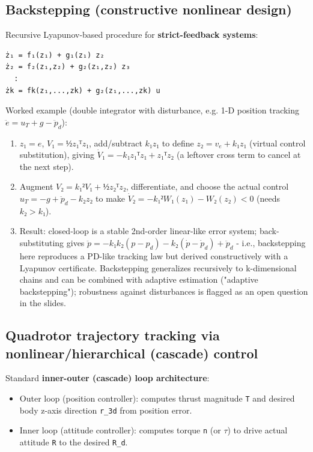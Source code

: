 \documentclass[11pt]{article}
\begin{document}
\subsection{Backstepping (constructive nonlinear design)}
Recursive Lyapunov-based procedure for \textbf{strict-feedback systems}:
\scriptsize
\begin{verbatim}
ż₁ = f₁(z₁) + g₁(z₁) z₂
ż₂ = f₂(z₁,z₂) + g₂(z₁,z₂) z₃
  :
żk = fk(z₁,...,zk) + g₂(z₁,...,zk) u
\end{verbatim}
\normalsize
Worked example (double integrator with disturbance, e.g. 1-D position tracking $\ddot{e} = u_T + g - \ddot{p}_d$):
\begin{enumerate}
\item $z₁=e$, $V₁=½z₁ᵀz₁$, add/subtract $k₁z₁$ to define $z₂ = v_e + k₁z₁$ (virtual control substitution), giving $\dot{V}₁ = -k₁z₁ᵀz₁ + z₁ᵀz₂$ (a leftover cross term to cancel at the next step).
\item Augment $V₂ = k₁²V₁ + ½z₂ᵀz₂$, differentiate, and choose the actual control $u_T = -g + \ddot{p}_d - k₂z₂$ to make $\dot{V}₂ = -k₁²W₁(z₁) - W₂(z₂) < 0$ (needs $k₂>k₁$).
\item Result: closed-loop is a stable 2nd-order linear-like error system; back-substituting gives $\ddot{p} = -k₁k₂(p-p_d) - k₂(\dot{p}-\dot{p}_d) + \ddot{p}_d$ - i.e., backstepping here reproduces a PD-like tracking law but derived constructively with a Lyapunov certificate. Backstepping generalizes recursively to k-dimensional chains and can be combined with adaptive estimation ("adaptive backstepping"); robustness against disturbances is flagged as an open question in the slides.
\end{enumerate}

\subsection{Quadrotor trajectory tracking via nonlinear/hierarchical (cascade) control}
Standard \textbf{inner-outer (cascade) loop architecture}:
\begin{itemize}
\item Outer loop (position controller): computes thrust magnitude \texttt{T} and desired body z-axis direction \texttt{r\_\allowbreak{}3d} from position error.
\item Inner loop (attitude controller): computes torque \texttt{n} (or $τ$) to drive actual attitude \texttt{R} to the desired \texttt{R\_\allowbreak{}d}.
\end{itemize}
\end{document}
